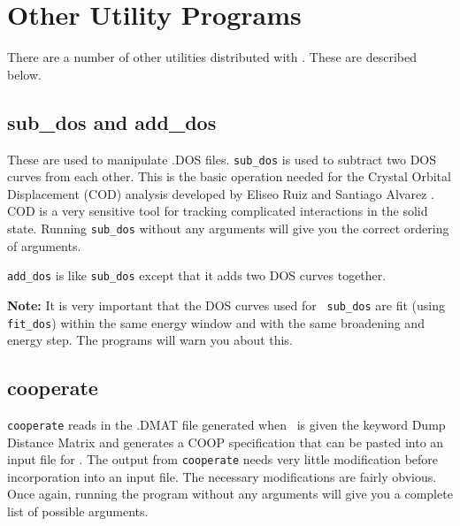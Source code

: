 \chapter{Other Utility Programs}

There are a number of other utilities distributed with \prog.  These
are described below.

\section{sub\_dos and add\_dos}

These are used to manipulate .DOS files.  {\tt sub\_dos} is used to
subtract two DOS curves from each other.  This is the basic operation
needed for the Crystal Orbital Displacement (COD) analysis developed
by Eliseo Ruiz and Santiago Alvarez \cite{cod}. COD is a very sensitive tool for tracking complicated interactions in the solid state.  Running {\tt sub\_dos} without any arguments will give you the correct ordering of arguments.

{\tt add\_dos} is like {\tt sub\_dos} except that it adds two DOS
curves together.

{\bf Note:} It is very important that the DOS curves used for {\tt
sub\_dos} are fit (using {\tt fit\_dos}) within the same energy window
and with the same broadening and energy step.  The programs will warn
you about this.

\section{cooperate}

{\tt cooperate} reads in the .DMAT file generated when \calcprog\ is
given the keyword {\sf Dump Distance Matrix} and generates a COOP
specification that can be pasted into an input file for \calcprog.
The output from {\tt cooperate} needs very little modification before
incorporation into an input file.  The necessary modifications are
fairly obvious.  Once again, running the program without any arguments
will give you a complete list of possible arguments.


